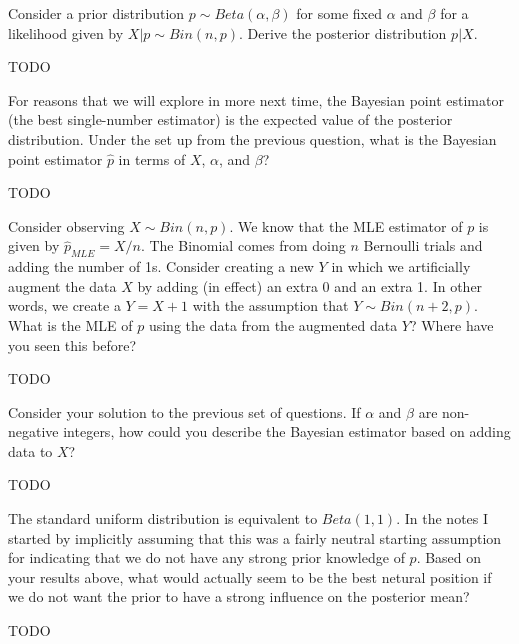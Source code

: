 
Consider a prior distribution $p \sim Beta(\alpha, \beta)$ for some fixed
$\alpha$ and $\beta$ for a likelihood given by $X|p \sim Bin(n, p)$. Derive
the posterior distribution $p|X$.


TODO


For reasons that we will explore in more next time, the Bayesian point estimator
(the best single-number estimator) is the expected value of the posterior
distribution. Under the set up from the previous question, what is the Bayesian
point estimator $\widehat{p}$ in terms of $X$, $\alpha$, and $\beta$?


TODO


Consider observing $X \sim Bin(n, p)$. We know that the MLE estimator of $p$ is
given by $\hat{p}_{MLE} = X / n$. The Binomial comes from doing $n$ Bernoulli
trials and adding the number of 1s. Consider creating a new $Y$ in which we 
artificially augment the data $X$ by adding (in effect) an extra 0 and an extra
1. In other words, we create a $Y = X + 1$ with the assumption that
$Y \sim Bin(n+2, p)$. What is the MLE of $p$ using the data from the augmented
data $Y$? Where have you seen this before?


TODO


Consider your solution to the previous set of questions. If $\alpha$ and $\beta$
are non-negative integers, how could you describe the Bayesian estimator based
on adding data to $X$? 


TODO


The standard uniform distribution is equivalent to $Beta(1,1)$. In the notes
I started by implicitly assuming that this was a fairly neutral starting
assumption for indicating that we do not have any strong prior knowledge of
$p$. Based on your results above, what would actually seem to be the best
netural position if we do not want the prior to have a strong influence on 
the posterior mean?


TODO
